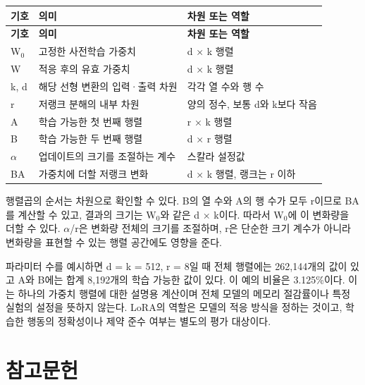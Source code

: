 \documentclass[11pt,a4paper]{article}
\begin{document}
\begingroup\small
\begin{longtable}{@{}>{\raggedright\arraybackslash}p{}>{\raggedright\arraybackslash}p{}>{\raggedright\arraybackslash}p{}@{}}
\toprule
\textbf{기호} & \textbf{의미} & \textbf{차원 또는 역할} \\
\midrule\endfirsthead
\toprule
\textbf{기호} & \textbf{의미} & \textbf{차원 또는 역할} \\
\midrule\endhead
\bottomrule\endfoot
W\ensuremath{{}_0} & 고정한 사전학습 가중치 & d × k 행렬 \\
W & 적응 후의 유효 가중치 & d × k 행렬 \\
k, d & 해당 선형 변환의 입력·출력 차원 & 각각 열 수와 행 수 \\
r & 저랭크 분해의 내부 차원 & 양의 정수, 보통 d와 k보다 작음 \\
A & 학습 가능한 첫 번째 행렬 & r × k 행렬 \\
B & 학습 가능한 두 번째 행렬 & d × r 행렬 \\
\ensuremath{\alpha} & 업데이트의 크기를 조절하는 계수 & 스칼라 설정값 \\
BA & 가중치에 더할 저랭크 변화 & d × k 행렬, 랭크는 r 이하 \\
\end{longtable}
\endgroup

행렬곱의 순서는 차원으로 확인할 수 있다. B의 열 수와 A의 행 수가 모두 r이므로 BA를 계산할 수 있고, 결과의 크기는 W\ensuremath{{}_0}와 같은 d × k이다. 따라서 W\ensuremath{{}_0}에 이 변화량을 더할 수 있다. \ensuremath{\alpha}/r은 변화량 전체의 크기를 조절하며, r은 단순한 크기 계수가 아니라 변화량을 표현할 수 있는 행렬 공간에도 영향을 준다.\par

파라미터 수를 예시하면 d = k = 512, r = 8일 때 전체 행렬에는 262,144개의 값이 있고 A와 B에는 합계 8,192개의 학습 가능한 값이 있다. 이 예의 비율은 3.125\%이다. 이는 하나의 가중치 행렬에 대한 설명용 계산이며 전체 모델의 메모리 절감률이나 특정 실험의 설정을 뜻하지 않는다. LoRA의 역할은 모델의 적응 방식을 정하는 것이고, 학습한 행동의 정확성이나 제약 준수 여부는 별도의 평가 대상이다.\par

\section*{참고문헌}
\end{document}
